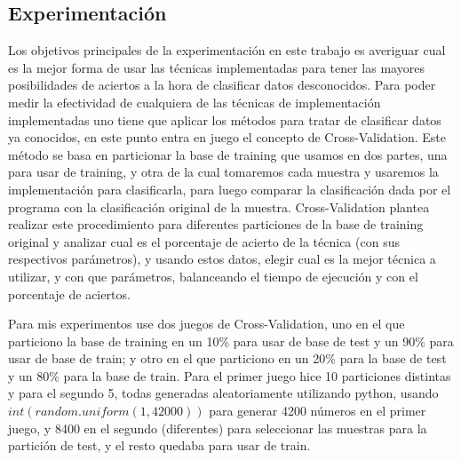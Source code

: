 \documentclass[a4paper]{article}
\begin{document}
\subsection{Experimentación}
Los objetivos principales de la experimentación en este trabajo es averiguar cual es la mejor forma de usar las técnicas implementadas para tener las mayores posibilidades de aciertos a la hora de clasificar datos desconocidos.\newline
Para poder medir la efectividad de cualquiera de las técnicas de implementación implementadas uno tiene que aplicar los métodos para tratar de clasificar datos ya conocidos, en este punto entra en juego el concepto de Cross-Validation. Este método se basa en particionar la base de training que usamos en dos partes, una para usar de training, y otra de la cual tomaremos cada muestra y usaremos la implementación para clasificarla, para luego comparar la clasificación dada por el programa con la clasificación original de la muestra.\newline
Cross-Validation plantea realizar este procedimiento para diferentes particiones de la base de training original y analizar cual es el porcentaje de acierto de la técnica (con sus respectivos parámetros), y usando estos datos, elegir cual es la mejor técnica a utilizar, y con que parámetros, balanceando el tiempo de ejecución y con el porcentaje de aciertos.\par\smallbreak
Para mis experimentos use dos juegos de Cross-Validation, uno en el que particiono la base de training en un 10\% para usar de base de test y un 90\% para usar de base de train; y otro en el que particiono en un 20\% para la base de test y un 80\% para la base de train. Para el primer juego hice 10 particiones distintas y para el segundo 5, todas generadas aleatoriamente utilizando python, usando $int(random.uniform(1,42000))$ para generar 4200 números en el primer juego, y 8400 en el segundo (diferentes) para seleccionar las muestras para la partición de test, y el resto quedaba para usar de train.
\end{document}
